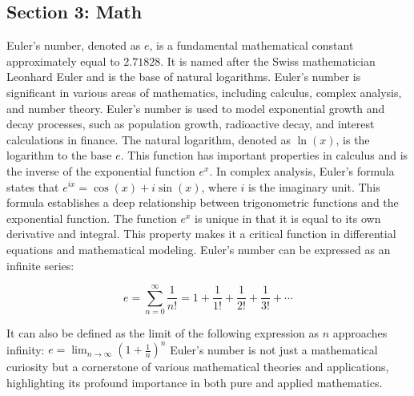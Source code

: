 \documentclass{article}
\begin{document}
\subsection*{Section 3: Math}
Euler's number, denoted as $e$, is a fundamental mathematical constant approximately equal to $2.71828$. It is named after the Swiss mathematician Leonhard Euler and is the base of natural logarithms. Euler's number is significant in various areas of mathematics, including calculus, complex analysis, and number theory. Euler's number is used to model exponential growth and decay processes, such as population growth, radioactive decay, and interest calculations in finance. The natural logarithm, denoted as $\ln\left(x\right)$, is the logarithm to the base $e$. This function has important properties in calculus and is the inverse of the exponential function $e^{x}$. In complex analysis, Euler's formula states that $ e^{ix} = \cos(x) + i\sin(x) $, where $i$ is the imaginary unit. This formula establishes a deep relationship between trigonometric functions and the exponential function. The function $ e^x$ is unique in that it is equal to its own derivative and integral. This property makes it a critical function in differential equations and mathematical modeling. Euler's number can be expressed as an infinite series: 

\begin{equation}
e = \sum_{n=0}^{\infty} \frac{1}{n!} = 1 + \frac{1}{1!} + \frac{1}{2!} + \frac{1}{3!} + \cdots
\end{equation}

 It can also be defined as the limit of the following expression as $n$ approaches infinity: $e = \lim_{n \to \infty} \left( 1 + \frac{1}{n} \right)^n$ Euler's number is not just a mathematical curiosity but a cornerstone of various mathematical theories and applications, highlighting its profound importance in both pure and applied mathematics.
\end{document}
